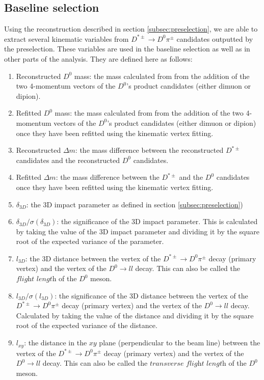 \subsection{Baseline selection}
\label{subsec:baseline_selection}

Using the reconstruction described in section \ref{subsec:preselection}, we are able to extract several kinematic variables from $D^{*\pm} \to D^0 \pi^\pm$ candidates outputted by the preselection. These variables are used in the baseline selection as well as in other parts of the analysis. They are defined here as follows:
\begin{enumerate}
    \item Reconstructed $D^0$ mass: the mass calculated from from the addition of the two 4-momentum vectors of the $D^0$'s product candidates (either dimuon or dipion). 
    \item Refitted $D^0$ mass: the mass calculated from from the addition of the two 4-momentum vectors of the $D^0$'s product candidates (either dimuon or dipion) once they have been refitted using the kinematic vertex fitting. 
    \item Reconstructed $\Delta m$: the mass difference between the reconstructed $D^{*\pm}$ candidates and the reconstructed $D^0$ candidates. 
    \item Refitted $\Delta m$: the mass difference between the $D^{*\pm}$ and the $D^0$ candidates once they have been refitted using the kinematic vertex fitting.
    \item $\delta_{3D}$: the 3D impact parameter as defined in section \ref{subsec:preselection})
    \item $\delta_{3D}/\sigma\left(\delta_{3D}\right)$: the significance of the 3D impact parameter. This is calculated by taking the value of the 3D impact parameter and dividing it by the square root of the expected variance of the parameter. 
    \item $l_{3D}$: the 3D distance between the vertex of the $D^{*\pm} \to D^0 \pi^\pm$ decay (primary vertex) and the vertex of the $D^0 \to l l$ decay. This can also be called the $\textit{flight length}$ of the $D^0$ meson. 
    \item $l_{3D}/\sigma\left(l_{3D}\right)$: the significance of the 3D distance between the vertex of the $D^{*\pm} \to D^0 \pi^\pm$ decay (primary vertex) and the vertex of the $D^0 \to l l$ decay. Calculated by taking the value of the distance and dividing it by the square root of the expected variance of the distance. 
    \item $l_{xy}$: the distance in the $xy$ plane (perpendicular to the beam line) between the vertex of the $D^{*\pm} \to D^0 \pi^\pm$ decay (primary vertex) and the vertex of the $D^0 \to l l$ decay.  This can also be called the $\textit{transverse flight length}$ of the $D^0$ meson. 

\end{enumerate}
